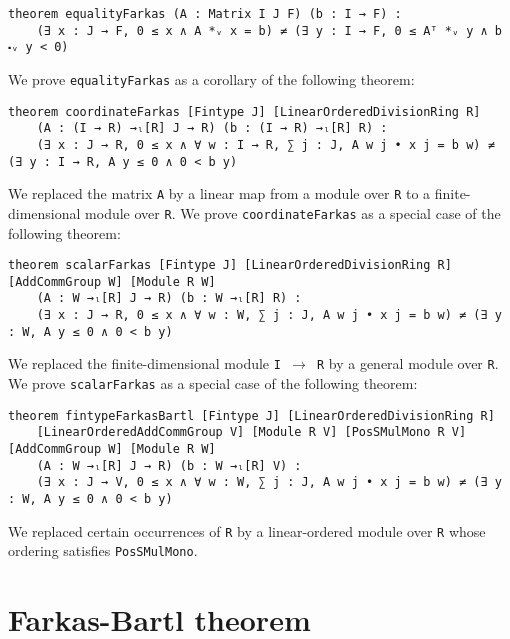 \documentclass[]{article}
\begin{document}
	

\begin{lstlisting}
theorem equalityFarkas (A : Matrix I J F) (b : I → F) :
    (∃ x : J → F, 0 ≤ x ∧ A *ᵥ x = b) ≠ (∃ y : I → F, 0 ≤ Aᵀ *ᵥ y ∧ b ⬝ᵥ y < 0)
\end{lstlisting}
We prove \texttt{equalityFarkas} as a corollary of the following theorem:
\begin{lstlisting}
theorem coordinateFarkas [Fintype J] [LinearOrderedDivisionRing R]
    (A : (I → R) →ₗ[R] J → R) (b : (I → R) →ₗ[R] R) :
    (∃ x : J → R, 0 ≤ x ∧ ∀ w : I → R, ∑ j : J, A w j • x j = b w) ≠ (∃ y : I → R, A y ≤ 0 ∧ 0 < b y)
\end{lstlisting}
We replaced the matrix \texttt{A} by a linear map
from a module over \texttt{R} to a finite-dimensional module over \texttt{R}.
We prove \texttt{coordinateFarkas} as a special case of the following theorem:
\begin{lstlisting}
theorem scalarFarkas [Fintype J] [LinearOrderedDivisionRing R] [AddCommGroup W] [Module R W]
    (A : W →ₗ[R] J → R) (b : W →ₗ[R] R) :
    (∃ x : J → R, 0 ≤ x ∧ ∀ w : W, ∑ j : J, A w j • x j = b w) ≠ (∃ y : W, A y ≤ 0 ∧ 0 < b y)
\end{lstlisting}
We replaced the finite-dimensional module \texttt{I $\rightarrow$ R} by a general module over \texttt{R}.
We prove \texttt{scalarFarkas} as a special case of the following theorem:
\begin{lstlisting}
theorem fintypeFarkasBartl [Fintype J] [LinearOrderedDivisionRing R]
    [LinearOrderedAddCommGroup V] [Module R V] [PosSMulMono R V] [AddCommGroup W] [Module R W]
    (A : W →ₗ[R] J → R) (b : W →ₗ[R] V) :
    (∃ x : J → V, 0 ≤ x ∧ ∀ w : W, ∑ j : J, A w j • x j = b w) ≠ (∃ y : W, A y ≤ 0 ∧ 0 < b y)
\end{lstlisting}
We replaced certain occurrences of \texttt{R} by a linear-ordered module over \texttt{R}
whose ordering satisfies \texttt{PosSMulMono}.

\section {Farkas-Bartl theorem}
\end{document}
